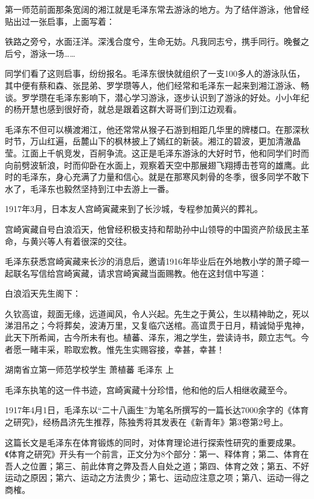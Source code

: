 \documentclass[../../dazhuan.tex]{subfiles}
\begin{document}
第一师范前面那条宽阔的湘江就是毛泽东常去游泳的地方。为了结伴游泳，他曾经贴出过一张启事，上面写着：

铁路之旁兮，水面汪洋。深浅合度兮，生命无妨。凡我同志兮，携手同行。晚餐之后兮，游泳一场……

同学们看了这则启事，纷纷报名。毛泽东很快就组织了一支100多人的游泳队伍，其中便有蔡和森、张昆弟、罗学瓒等人，他们经常和毛泽东一起来到湘江游泳、畅谈。罗学瓒在毛泽东影响下，潜心学习游泳，逐步认识到了游泳的好处。小小年纪的杨开慧也感到很好奇，就总是跟着这群大哥哥们到江边观看。

毛泽东不但可以横渡湘江，他还常常从猴子石游到相距几华里的牌楼口。在那深秋时节，万山红遍，岳麓山下的枫林披上了嫣红的新装。湘江的碧波，更加清澈晶莹。江面上千帆竞发，百舸争流。这正是毛泽东游泳的大好时节，他和同学们时而向前劈波斩浪，时而仰卧在水面上，观察着天空中那展翅飞翔搏击苍穹的雄鹰。此时的毛泽东，身心充满了力量和信心。就是在那寒风刺骨的冬季，很多同学不敢下水了，毛泽东也毅然坚持到江中去游上一番。

1917年3月，日本友人宫崎寅藏来到了长沙城，专程参加黄兴的葬礼。

宫崎寅藏自号白浪滔天，他曾经积极支持和帮助孙中山领导的中国资产阶级民主革命，与黄兴等人有着很深的交往。

毛泽东获悉宫崎寅藏来长沙的消息后，邀请1916年毕业后在外地教小学的萧子暲一起联名写信给宫崎寅藏，请求宫崎寅藏当面赐教。他在这封信中写道：
\begin{xquote}
白浪滔天先生阁下：

久钦高谊，觌面无缘，远道闻风，令人兴起。先生之于黄公，生以精神助之，死以涕泪吊之；今将葬矣，波涛万里，又复临穴送棺。高谊贯于日月，精诚恸乎鬼神，此天下所希闻，古今所未有也。植蕃、泽东，湘之学生，尝读诗书，颇立志气。今者愿一睹丰采，聆取宏教。惟先生实赐容接，幸甚，幸甚！

\begin{sign}
湖南省立第一师范学校学生  萧植蕃 毛泽东 上\end{sign}
\end{xquote}

毛泽东执笔的这一件书迹，宫崎寅藏十分珍惜，他和他的后人相继收藏至今。

1917年4月1日，毛泽东以“二十八画生”为笔名所撰写的一篇长达7000余字的《体育之研究》，经杨昌济先生推荐，陈独秀将其发表在《新青年》第3卷第2号上。

这篇长文是毛泽东在体育锻炼的同时，对体育理论进行探索性研究的重要成果。《体育之研究》开头有一个前言，正文分为8个部分：第一、释体育；第二、体育在吾人之位置；第三、前此体育之弊及吾人自处之道；第四、体育之效；第五、不好运动之原因；第六、运动之方法贵少；第七、运动应注意之项；第八、运动一得之商榷。
\end{document}
